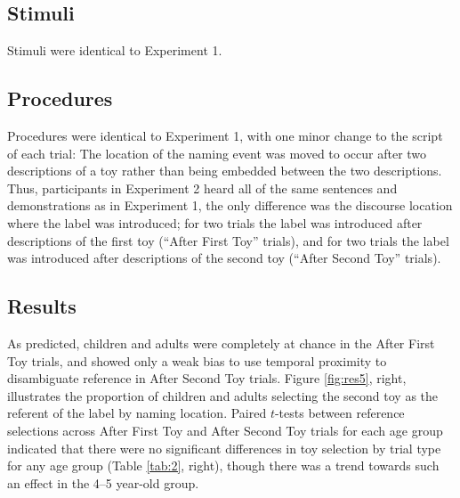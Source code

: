 \documentclass[man]{apa2}
\begin{document}
\subsection{Stimuli}

Stimuli were identical to Experiment 1. 

\subsection{Procedures}

Procedures were identical to Experiment 1, with one minor change to the script of each trial: The location of the naming event was moved to occur after two descriptions of a toy rather than being embedded between the two descriptions. Thus, participants in Experiment 2 heard all of the same sentences and demonstrations as in Experiment 1, the only difference was the discourse location where the label was introduced; for two trials the label was introduced after descriptions of the first toy (``After First Toy'' trials), and for two trials the label was introduced after descriptions of the second toy (``After Second Toy'' trials).  

\subsection{Results}

As predicted, children and adults were completely at chance in the After First Toy trials, and showed only a weak bias to use temporal proximity to disambiguate reference in After Second Toy trials. Figure \ref{fig:res5}, right, illustrates the proportion of children and adults selecting the second toy as the referent of the label by naming location.  Paired $t$-tests between reference selections across After First Toy and After Second Toy trials for each age group indicated that there were no significant differences in toy selection by trial type for any age group (Table \ref{tab:2}, right), though there was a trend towards such an effect in the 4--5 year-old group. 



\end{document}
